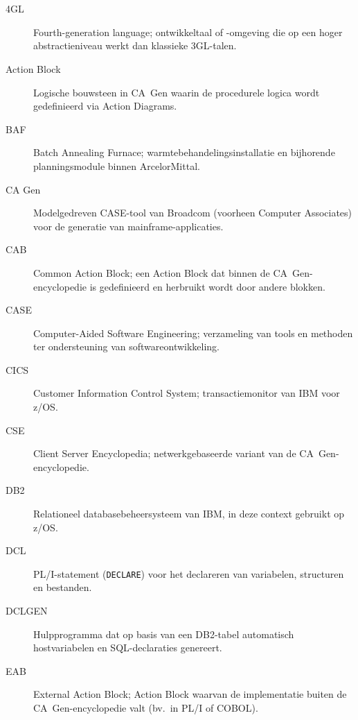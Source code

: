 
\chapter*{}%
\label{ch:afkortingen}

\begin{description}
    \item[4GL] Fourth-generation language; ontwikkeltaal of -omgeving die op een hoger abstractieniveau werkt dan klassieke 3GL-talen.
    \item[Action Block] Logische bouwsteen in CA~Gen waarin de procedurele logica wordt gedefinieerd via Action Diagrams.
    \item[BAF] Batch Annealing Furnace; warmtebehandelingsinstallatie en bijhorende planningsmodule binnen ArcelorMittal.
    \item[CA Gen] Modelgedreven CASE-tool van Broadcom (voorheen Computer Associates) voor de generatie van mainframe-applicaties.
    \item[CAB] Common Action Block; een Action Block dat binnen de CA~Gen-encyclopedie is gedefinieerd en herbruikt wordt door andere blokken.
    \item[CASE] Computer-Aided Software Engineering; verzameling van tools en methoden ter ondersteuning van softwareontwikkeling.
    \item[CICS] Customer Information Control System; transactiemonitor van IBM voor z/OS.
    \item[CSE] Client Server Encyclopedia; netwerkgebaseerde variant van de CA~Gen-encyclopedie.
    \item[DB2] Relationeel databasebeheersysteem van IBM, in deze context gebruikt op z/OS.
    \item[DCL] PL/I-statement (\texttt{DECLARE}) voor het declareren van variabelen, structuren en bestanden.
    \item[DCLGEN] Hulpprogramma dat op basis van een DB2-tabel automatisch hostvariabelen en SQL-declaraties genereert.
    \item[EAB] External Action Block; Action Block waarvan de implementatie buiten de CA~Gen-encyclopedie valt (bv.\ in PL/I of COBOL).

\end{description}
